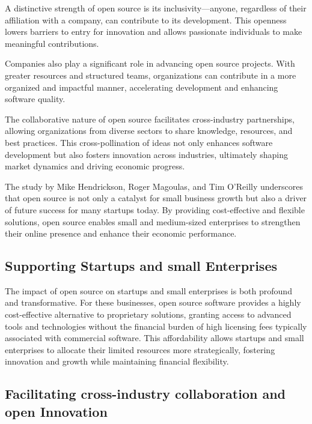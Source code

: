 A distinctive strength of open source is its inclusivity—anyone, regardless of their affiliation with a company,
can contribute to its development. 
This openness lowers barriers to entry for innovation and allows passionate individuals to make meaningful contributions.

Companies also play a significant role in advancing open source projects. 
With greater resources and structured teams, organizations can contribute in a more organized and impactful manner, 
accelerating development and enhancing software quality.

The collaborative nature of open source facilitates cross-industry partnerships, 
allowing organizations from diverse sectors to share knowledge, resources, and best practices. 
This cross-pollination of ideas not only enhances software development but also fosters innovation across industries, 
ultimately shaping market dynamics and driving economic progress.

The study \cite{opensource_hendrickson2012economic} by Mike Hendrickson, Roger Magoulas, 
and Tim O'Reilly underscores that open source is not only a catalyst for small business growth but also a driver of future success for many startups today. 
By providing cost-effective and flexible solutions,
open source enables small and medium-sized enterprises to strengthen their online presence and enhance their economic performance.


\subsection{Supporting Startups and small Enterprises}

The impact of open source on startups and small enterprises is both profound and transformative. 
For these businesses, open source software provides a highly cost-effective alternative to proprietary solutions, 
granting access to advanced tools and technologies without the financial burden of high licensing fees typically associated with commercial software. 
This affordability allows startups and small enterprises to allocate their limited resources more strategically,
fostering innovation and growth while maintaining financial flexibility.
\cite{stu-up-ben}



\subsection{Facilitating cross-industry collaboration and open Innovation}


